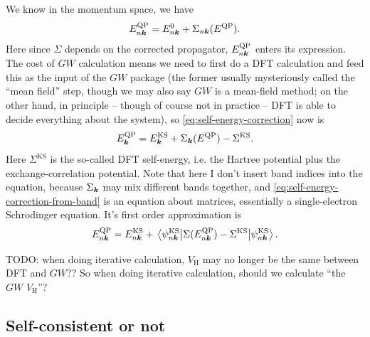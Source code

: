 \documentclass[hyperref, a4paper]{report}
\begin{document}
We know in the momentum space, we have 
\begin{equation}
    E^{\text{QP}}_{n \vb*{k}} = E^{0}_{n \vb*{k}} + \Sigma_{n \vb*{k}} (E^{\text{QP}}).
    \label{eq:self-energy-correction}
\end{equation}
Here since $\Sigma$ depends on the corrected propagator,
$E^\text{QP}_{n \vb*{k}}$ enters its expression.
The cost of $GW$ calculation means we need to first do a DFT calculation 
and feed this as the input of the $GW$ package 
(the former usually mysteriously called the ``mean field'' step,
though we may also say $GW$ is a mean-field method;
on the other hand, in principle -- though of course not in practice -- 
DFT is able to decide everything about the system), 
so \eqref{eq:self-energy-correction} now is 
\begin{equation}
    E^{\text{QP}}_{\vb*{k}} = E^{\text{KS}}_{\vb*{k}} + \Sigma_{\vb*{k}} (E^{\text{QP}}) - \Sigma^{\text{KS}}.
    \label{eq:self-energy-correction-from-band}
\end{equation}
Here $\Sigma^{\text{KS}}$ is the so-called DFT self-energy,
i.e. the Hartree potential plus the exchange-correlation potential.
Note that here I don't insert band indices into the equation,
because $\Sigma_{\vb*{k}}$ may mix different bands together,
and \eqref{eq:self-energy-correction-from-band} is an equation about matrices,
essentially a single-electron Schrodinger equation.
It's first order approximation is
\begin{equation}
    E^{\text{QP}}_{n \vb*{k}} = E^{\text{KS}}_{n \vb*{k}} + 
    \mel{\psi^{\text{KS}}_{n \vb*{k}}}{\Sigma (E^{\text{QP}}_{n \vb*{k}}) - \Sigma^{\text{KS}}}{\psi^{\text{KS}}_{n \vb*{k}}}.
    \label{eq:self-energy-first-order}
\end{equation}

TODO: when doing iterative calculation, $V_{\text{H}}$ may no longer be the same between DFT and $GW$??
So when doing iterative calculation, should we calculate ``the $GW$ $V_{\text{H}}$''?

\subsection{Self-consistent or not}\label{sec:gw-bse.accuracy.self-consistent}
\end{document}

